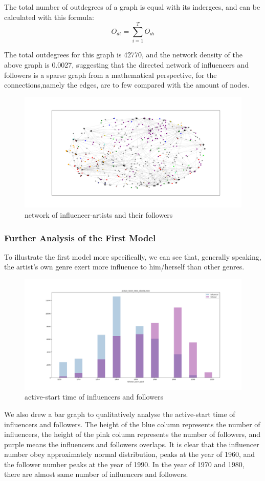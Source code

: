 \documentclass[12pt]{article}
\begin{document}
The total number of outdegrees of a graph is equal with its indergees, and can be calculated with this formula:\[{O_{dt}} = \sum\limits_{i = 1}^T {{O_{di}}} \]


The total outdegrees for this graph is 42770, and the network density of the above graph is 0.0027, suggesting that the directed network of influencers and followers is a sparse graph from a mathematical perspective, for the connections,namely the edges, are to few compared with the amount of nodes.
\begin{figure}[h]
\small
\centering
\includegraphics[width=17cm]{firstmodel.png}
\caption{network of influencer-artists and their followers}
\end{figure}

\subsubsection{Further Analysis of the First Model}\quad\;
To illustrate the first model more specifically, we can see that, generally speaking, the artist’s own genre exert more influence to him/herself than other genres.

\begin{figure}[h]
\small
\centering
\includegraphics[width=18cm]{Figure_5.png}
\caption{active-start time of influencers and followers}
\end{figure}
We also drew a bar graph to qualitatively analyse the active-start time of influencers and followers. The height of the blue column represents the number of influencers, the height of the pink column represents the number of followers, and purple means the influencers and followers overlaps. It is clear that the influencer number obey approximately normal distribution, peaks at the year of 1960, and the follower 
number peaks at the year of 1990. In the year of 1970 and 1980, there are almost same number of influencers and followers.
\end{document}
